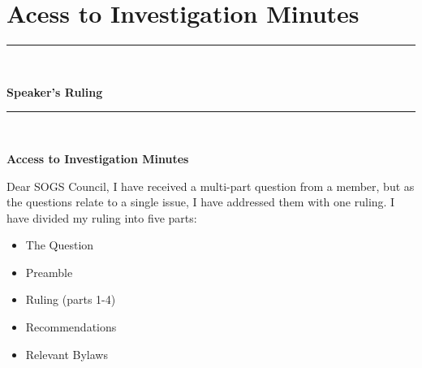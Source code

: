 \section*{Acess to Investigation Minutes}
\begin{center}
\rule{\textwidth}{3.6pt}\\[\baselineskip] %
\begin{Huge}
\textbf{Speaker's Ruling}
\end{Huge}

\rule{\textwidth}{3.6pt}\\[\baselineskip] %



\vspace*{2\baselineskip} %

{\large  \textbf{Access to Investigation Minutes}}
\end{center}



Dear SOGS Council,
I have received a multi-part question from a member, but as the questions relate to a single issue, I have addressed them with one ruling. I have divided my ruling into five parts:
\begin{itemize}
\item The Question
\item Preamble
\item Ruling (parts 1-4)
\item Recommendations
\item Relevant Bylaws
\end{itemize}

